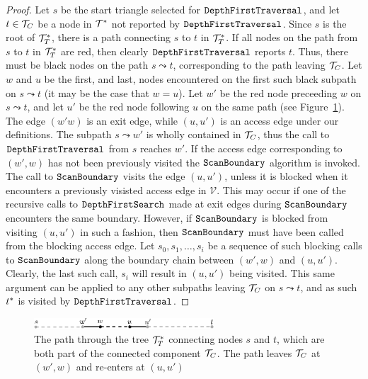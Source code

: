   \begin{proof}
  Let $s$ be the start triangle selected for $\texttt{DepthFirstTraversal}$,
  and let $t \in {\mathcal{T}}_C$ be a node in $\mathcal{T}^*$ not reported by 
  $\texttt{DepthFirstTraversal}$.
  Since $s$ is the root of $\mathcal{T}^*_T$, there is a path connecting $s$ 
  to $t$ in  $\mathcal{T}^*_T$. 
  If all nodes on the path from $s$ to $t$ in $\mathcal{T}^*_T$ are red, then
  clearly $\texttt{DepthFirstTraversal}$ reports $t$.
  Thus, there must be black nodes on the path $s \leadsto t$, corresponding to
  the path leaving ${\mathcal{T}}_C$.
  Let $w$ and $u$ be the first, and last, nodes encountered on the first such
  black subpath on $s \leadsto t$ (it may be the case that $w = u$).
  Let $w'$ be the red node preceeding $w$ on $s \leadsto t$, and let $u'$ be
  the red node following $u$ on the same path (see 
  Figure~\ref{fig:component_subpaths}).
  The edge $(w'w)$ is an exit edge, while $(u,u')$ is an access edge under
  our definitions. 
  The subpath $s \leadsto w'$ is wholly contained in ${\mathcal{T}}_C$, thus the call
  to $\texttt{DepthFirstTraversal}$ from $s$ reaches $w'$.
  If the access edge corresponding to $(w',w)$ has not 
  been previously visited the $\texttt{ScanBoundary}$ algorithm is invoked.
  The call to $\texttt{ScanBoundary}$ visits the edge $(u,u')$, unless it
  is blocked when it encounters a previously visisted access edge in 
  $\mathcal{V}$.
  This may  occur if one of the recursive 
  calls to $\texttt{DepthFirstSearch}$ made at exit edges during 
  $\texttt{ScanBoundary}$ 
  encounters the same boundary. 
  However, if $\texttt{ScanBoundary}$ is blocked from visiting $(u,u')$ in 
  such a fashion, then $\texttt{ScanBoundary}$ must have been called
  from the blocking access edge. 
  Let $s_0, s_1, \ldots, s_i$ be a sequence of such blocking calls to 
  $\texttt{ScanBoundary}$ along the boundary chain between $(w',w)$ 
  and $(u,u')$. 
  Clearly, the last such call, $s_i$ will result in $(u,u')$ being visited. 
  This same argument can be applied to any other subpaths leaving 
  ${\mathcal{T}}_C$ on $s \leadsto t$, and as such $t^*$ is visited by 
  $\texttt{DepthFirstTraversal}$.
  \end{proof}

  \begin{figure}[th]
	  \centering
		  \includegraphics[width=0.6\textwidth]{Fig12}
	  \caption[General component subpaths]{The path through the tree 
	  $\mathcal{T}^*_T$ connecting nodes $s$ and $t$, which are both
	  part of the connected component ${\mathcal{T}}_C$. 
	  The path leaves ${\mathcal{T}}_C$ at $(w',w)$ and re-enters at $(u,u')$}
	  \label{fig:component_subpaths}
  \end{figure}
  
